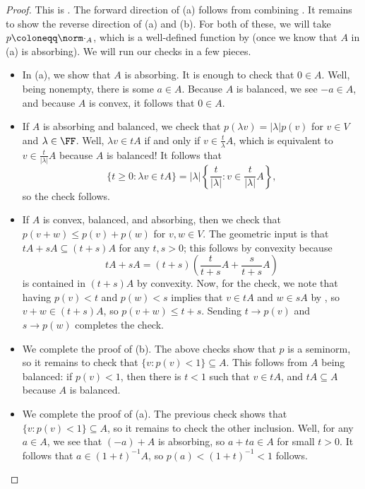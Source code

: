 \documentclass[notes.tex]{subfiles}
\begin{document}
\begin{proof}
	This is \cite[Proposition~1.14]{conway-functional}. The forward direction of (a) follows from combining . It remains to show the reverse direction of (a) and (b). For both of these, we will take $p\coloneqq\norm\cdot_A$, which is a well-defined function by  (once we know that $A$ in (a) is absorbing). We will run our checks in a few pieces.
	\begin{itemize}
		\item In (a), we show that $A$ is absorbing. It is enough to check that $0\in A$. Well, being nonempty, there is some $a\in A$. Because $A$ is balanced, we see $-a\in A$, and because $A$ is convex, it follows that $0\in A$.
		\item If $A$ is absorbing and balanced, we check that $p(\lambda v)=\left|\lambda\right|p(v)$ for $v\in V$ and $\lambda\in\FF$. Well, $\lambda v\in tA$ if and only if $v\in\frac t\lambda A$, which is equivalent to $v\in\frac t{\left|\lambda\right|}A$ because $A$ is balanced! It follows that
		\[\{t\ge0:\lambda v\in tA\}=\left|\lambda\right|\left\{\frac t{\left|\lambda\right|}:v\in\frac t{\left|\lambda\right|}A\right\},\]
		so the check follows.
		\item If $A$ is convex, balanced, and absorbing, then we check that $p(v+w)\le p(v)+p(w)$ for $v,w\in V$. The geometric input is that $tA+sA\subseteq(t+s)A$ for any $t,s>0$; this follows by convexity because
		\[tA+sA=(t+s)\left(\frac t{t+s}A+\frac s{t+s}A\right)\]
		is contained in $(t+s)A$ by convexity. Now, for the check, we note that having $p(v)<t$ and $p(w)<s$ implies that $v\in tA$ and $w\in sA$ by , so $v+w\in(t+s)A$, so $p(v+w)\le t+s$. Sending $t\to p(v)$ and $s\to p(w)$ completes the check.
		\item We complete the proof of (b). The above checks show that $p$ is a seminorm, so it remains to check that $\{v:p(v)<1\}\subseteq A$. This follows from $A$ being balanced: if $p(v)<1$, then there is $t<1$ such that $v\in tA$, and $tA\subseteq A$ because $A$ is balanced.
		\item We complete the proof of (a). The previous check shows that $\{v:p(v)<1\}\subseteq A$, so it remains to check the other inclusion. Well, for any $a\in A$, we see that $(-a)+A$ is absorbing, so $a+ta\in A$ for small $t>0$. It follows that $a\in(1+t)^{-1}A$, so $p(a)<(1+t)^{-1}<1$ follows.
		\qedhere
	\end{itemize}
\end{proof}
\end{document}
